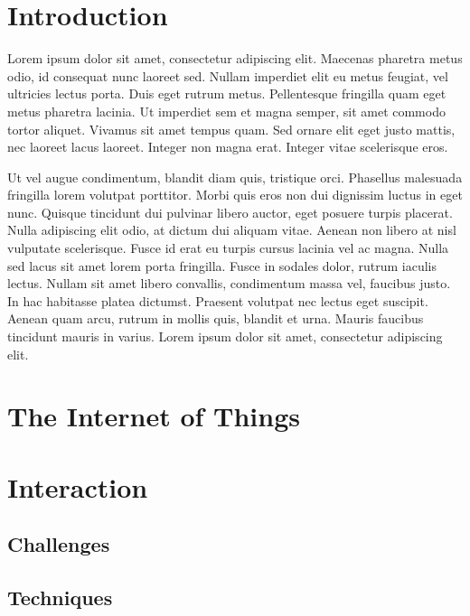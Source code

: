 


\section{Introduction}
Lorem ipsum dolor sit amet, consectetur adipiscing elit. Maecenas pharetra metus odio, id consequat nunc laoreet sed. Nullam imperdiet elit eu metus feugiat, vel ultricies lectus porta. Duis eget rutrum metus. Pellentesque fringilla quam eget metus pharetra lacinia. Ut imperdiet sem et magna semper, sit amet commodo tortor aliquet. Vivamus sit amet tempus quam. Sed ornare elit eget justo mattis, nec laoreet lacus laoreet. Integer non magna erat. Integer vitae scelerisque eros.

Ut vel augue condimentum, blandit diam quis, tristique orci. Phasellus malesuada fringilla lorem volutpat porttitor. Morbi quis eros non dui dignissim luctus in eget nunc. Quisque tincidunt dui pulvinar libero auctor, eget posuere turpis placerat. Nulla adipiscing elit odio, at dictum dui aliquam vitae. Aenean non libero at nisl vulputate scelerisque. Fusce id erat eu turpis cursus lacinia vel ac magna. Nulla sed lacus sit amet lorem porta fringilla. Fusce in sodales dolor, rutrum iaculis lectus. Nullam sit amet libero convallis, condimentum massa vel, faucibus justo. In hac habitasse platea dictumst. Praesent volutpat nec lectus eget suscipit. Aenean quam arcu, rutrum in mollis quis, blandit et urna. Mauris faucibus tincidunt mauris in varius. Lorem ipsum dolor sit amet, consectetur adipiscing elit.
\section{The Internet of Things}
\section{Interaction}
\subsection{Challenges}
\subsection{Techniques}




\balancecolumns

